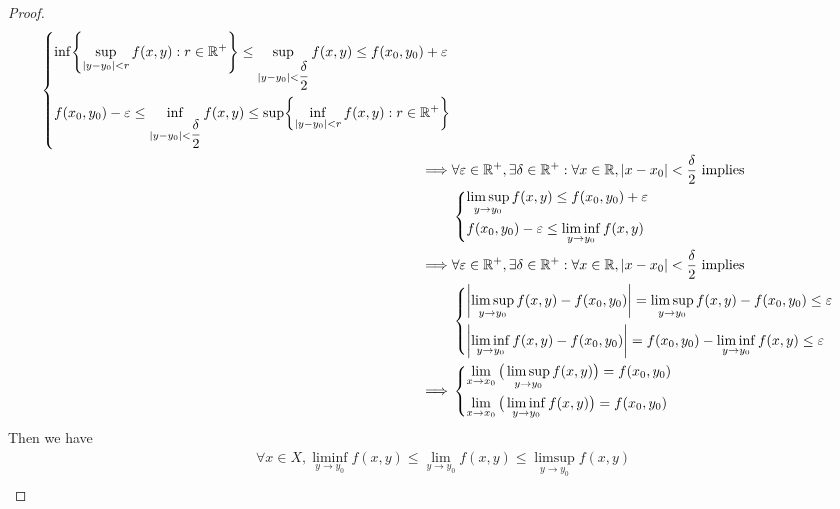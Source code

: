 \begin{proof}
\begin{align*}
\begin{dcases}
                 \inf\set{\sup_{\abs{y - y_0} < r} f(x, y) : r \in \R^+} \leq \sup_{\abs{y - y_0} < \dfrac{\delta}{2}} f(x, y) \leq f(x_0, y_0) + \varepsilon \\
                 f(x_0, y_0) - \varepsilon \leq \inf_{\abs{y - y_0} < \dfrac{\delta}{2}} f(x, y) \leq \sup\set{\inf_{\abs{y - y_0} < r} f(x, y) : r \in \R^+}
               \end{dcases}          \\
    \implies & \forall \varepsilon \in \R^+, \exists \delta \in \R^+ : \forall x \in \R, \abs{x - x_0} < \dfrac{\delta}{2} \text{ implies}                                          \\
             & \begin{dcases}
                 \limsup_{y \to y_0} f(x, y) \leq f(x_0, y_0) + \varepsilon \\
                 f(x_0, y_0) - \varepsilon \leq \liminf_{y \to y_0} f(x, y)
               \end{dcases}                                                                                                           \\
    \implies & \forall \varepsilon \in \R^+, \exists \delta \in \R^+ : \forall x \in \R, \abs{x - x_0} < \dfrac{\delta}{2} \text{ implies}                                          \\
             & \begin{dcases}
                 \abs{\limsup_{y \to y_0} f(x, y) - f(x_0, y_0)} = \limsup_{y \to y_0} f(x, y) - f(x_0, y_0) \leq \varepsilon \\
                 \abs{\liminf_{y \to y_0} f(x, y) - f(x_0, y_0)} = f(x_0, y_0) - \liminf_{y \to y_0} f(x, y) \leq \varepsilon
               \end{dcases}                                                     \\
    \implies & \begin{dcases}
                 \lim_{x \to x_0} \big(\limsup_{y \to y_0} f(x, y)\big) = f(x_0, y_0) \\
                 \lim_{x \to x_0} \big(\liminf_{y \to y_0} f(x, y)\big) = f(x_0, y_0)
               \end{dcases}
  \end{align*}
  Then we have
  \begin{align*}
             & \forall x \in X, \liminf_{y \to y_0} f(x, y) \leq \lim_{y \to y_0} f(x, y) \leq \limsup_{y \to y_0} f(x, y)                              \\

\end{align*}
\end{proof}
